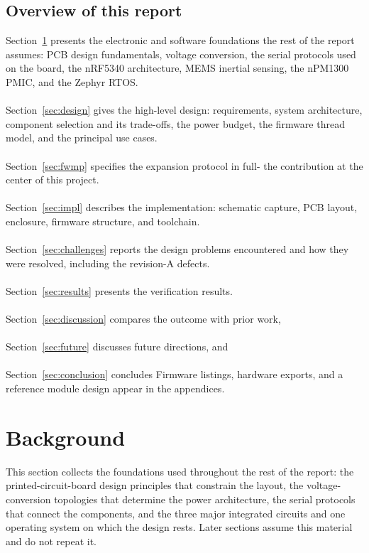 \documentclass[12pt, a4paper]{article}
\begin{document}
\subsection{Overview of this report}

Section~\ref{sec:background} presents the electronic and software foundations
the rest of the report assumes: PCB design fundamentals, voltage conversion,
the serial protocols used on the board, the nRF5340 architecture, MEMS inertial
sensing, the nPM1300 PMIC, and the Zephyr RTOS.\\\\
Section~\ref{sec:design} gives
the high-level design: requirements, system architecture, component selection
and its trade-offs, the power budget, the firmware thread model, and the
principal use cases.\\\\
Section~\ref{sec:fwmp} specifies the expansion protocol in
full- the contribution at the center of this project.\\\\
Section~\ref{sec:impl} describes the implementation: schematic capture, PCB
layout, enclosure, firmware structure, and toolchain.\\\\
Section~\ref{sec:challenges} reports the design problems encountered and how
they were resolved, including the revision-A defects.\\\\
Section~\ref{sec:results} presents the verification results.\\\\
Section~\ref{sec:discussion} compares the outcome with prior work,\\\\
Section~\ref{sec:future} discusses future directions, and\\\\
Section~\ref{sec:conclusion} concludes Firmware listings, hardware exports,
and a reference module design appear in the appendices.

\section{Background}
\label{sec:background}

This section collects the foundations used throughout the rest of the report:
the printed-circuit-board design principles that constrain the layout, the
voltage-conversion topologies that determine the power architecture, the serial
protocols that connect the components, and the three major integrated circuits
and one operating system on which the design rests. Later sections assume this
material and do not repeat it.
\end{document}
